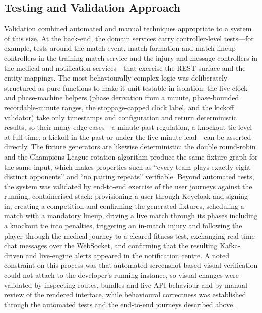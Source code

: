\subsection{Testing and Validation Approach}
Validation combined automated and manual techniques appropriate to a system of this size. At the back-end, the domain services
carry controller-level tests---for example, tests around the match-event, match-formation and match-lineup controllers in the
training-match service and the injury and message controllers in the medical and notification services---that exercise the REST
surface and the entity mappings. The most behaviourally complex logic was deliberately structured as pure functions to make it
unit-testable in isolation: the live-clock and phase-machine helpers (phase derivation from a minute, phase-bounded recordable-minute
ranges, the stoppage-capped clock label, and the kickoff validator) take only timestamps and configuration and return deterministic
results, so their many edge cases---a minute past regulation, a knockout tie level at full time, a kickoff in the past or under the
five-minute lead---can be asserted directly. The fixture generators are likewise deterministic: the double round-robin and the
Champions League rotation algorithm produce the same fixture graph for the same input, which makes properties such as ``every team
plays exactly eight distinct opponents'' and ``no pairing repeats'' verifiable. Beyond automated tests, the system was validated by
end-to-end exercise of the user journeys against the running, containerised stack: provisioning a user through Keycloak and signing
in, creating a competition and confirming the generated fixtures, scheduling a match with a mandatory lineup, driving a live match
through its phases including a knockout tie into penalties, triggering an in-match injury and following the player through the
medical journey to a cleared fitness test, exchanging real-time chat messages over the WebSocket, and confirming that the resulting
Kafka-driven and live-engine alerts appeared in the notification centre. A noted constraint on this process was that automated
screenshot-based visual verification could not attach to the developer's running instance, so visual changes were validated by
inspecting routes, bundles and live-API behaviour and by manual review of the rendered interface, while behavioural correctness was
established through the automated tests and the end-to-end journeys described above.

